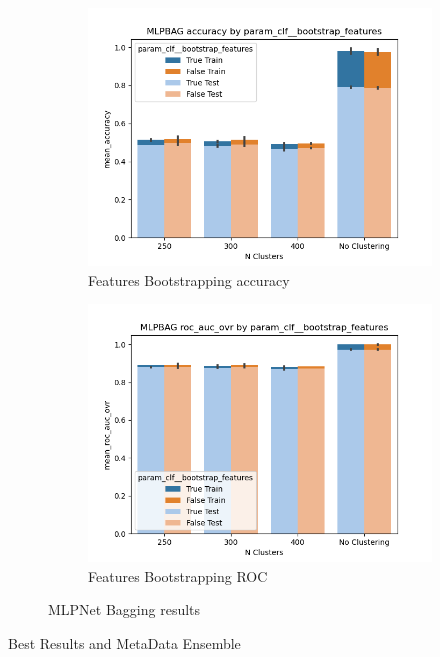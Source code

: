 \documentclass[12pt]{article}
\begin{document}
\begin{figure}
\begin{subfigure}{.5\textwidth}
      \includegraphics[width=.95\textwidth]{../../results/mlpbag/param_clf__bootstrap_features_accuracy_param_Kmean.png}
      \caption{Features Bootstrapping accuracy}
      \end{subfigure}%
    \begin{subfigure}{.5\textwidth}
      \includegraphics[width=.95\textwidth]{../../results/mlpbag/param_clf__bootstrap_features_roc_auc_ovr_param_Kmean.png}
      \caption{Features Bootstrapping ROC}
    \end{subfigure}
    \caption{MLPNet Bagging results}
    \label{figure2}
\end{figure}

\begin{table}
  \resizebox*{.95\textwidth}{!}{}
  \caption{Best Results and MetaData Ensemble}
  \label{table2}
\end{table}
\end{document}
